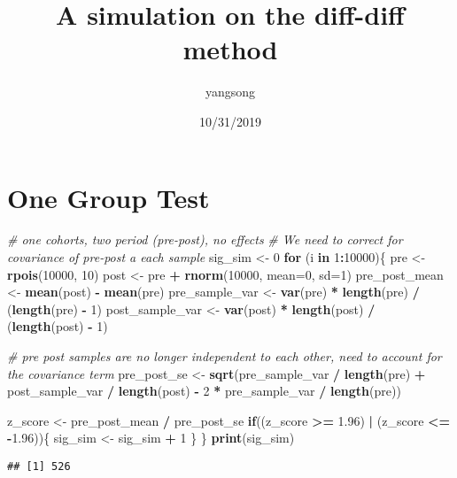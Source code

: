 \documentclass[]{article}
\title{A simulation on the diff-diff method}
\author{yangsong}
\date{10/31/2019}
\newenvironment{Shaded}{\begin{snugshade}}{\end{snugshade}}
\newcommand{\KeywordTok}[1]{\textcolor[rgb]{0.13,0.29,0.53}{\textbf{#1}}}
\newcommand{\DataTypeTok}[1]{\textcolor[rgb]{0.13,0.29,0.53}{#1}}
\newcommand{\DecValTok}[1]{\textcolor[rgb]{0.00,0.00,0.81}{#1}}
\newcommand{\FloatTok}[1]{\textcolor[rgb]{0.00,0.00,0.81}{#1}}
\newcommand{\StringTok}[1]{\textcolor[rgb]{0.31,0.60,0.02}{#1}}
\newcommand{\CommentTok}[1]{\textcolor[rgb]{0.56,0.35,0.01}{\textit{#1}}}
\newcommand{\ControlFlowTok}[1]{\textcolor[rgb]{0.13,0.29,0.53}{\textbf{#1}}}
\newcommand{\OperatorTok}[1]{\textcolor[rgb]{0.81,0.36,0.00}{\textbf{#1}}}
\newcommand{\NormalTok}[1]{#1}
\begin{document}
\maketitle

{
\setcounter{tocdepth}{2}
\tableofcontents
}
\section{One Group Test}\label{one-group-test}

\begin{Shaded}
\begin{Highlighting}[]
\CommentTok{# one cohorts, two period (pre-post), no effects}
\CommentTok{# We need to correct for covariance of pre-post a each sample}
\NormalTok{sig_sim <-}\StringTok{ }\DecValTok{0} 
\ControlFlowTok{for}\NormalTok{ (i }\ControlFlowTok{in} \DecValTok{1}\OperatorTok{:}\DecValTok{10000}\NormalTok{)\{}
\NormalTok{  pre <-}\StringTok{ }\KeywordTok{rpois}\NormalTok{(}\DecValTok{10000}\NormalTok{, }\DecValTok{10}\NormalTok{)}
\NormalTok{  post <-}\StringTok{ }\NormalTok{pre }\OperatorTok{+}\StringTok{ }\KeywordTok{rnorm}\NormalTok{(}\DecValTok{10000}\NormalTok{, }\DataTypeTok{mean=}\DecValTok{0}\NormalTok{, }\DataTypeTok{sd=}\DecValTok{1}\NormalTok{)}
\NormalTok{  pre_post_mean <-}\StringTok{ }\KeywordTok{mean}\NormalTok{(post) }\OperatorTok{-}\StringTok{ }\KeywordTok{mean}\NormalTok{(pre)}
\NormalTok{  pre_sample_var <-}\StringTok{  }\KeywordTok{var}\NormalTok{(pre) }\OperatorTok{*}\StringTok{ }\KeywordTok{length}\NormalTok{(pre) }\OperatorTok{/}\StringTok{ }\NormalTok{(}\KeywordTok{length}\NormalTok{(pre) }\OperatorTok{-}\StringTok{ }\DecValTok{1}\NormalTok{)}
\NormalTok{  post_sample_var <-}\StringTok{  }\KeywordTok{var}\NormalTok{(post) }\OperatorTok{*}\StringTok{ }\KeywordTok{length}\NormalTok{(post) }\OperatorTok{/}\StringTok{ }\NormalTok{(}\KeywordTok{length}\NormalTok{(post) }\OperatorTok{-}\StringTok{ }\DecValTok{1}\NormalTok{)}

  \CommentTok{# pre post samples are no longer independent to each other, need to account for the covariance term}
\NormalTok{  pre_post_se <-}\StringTok{ }\KeywordTok{sqrt}\NormalTok{(pre_sample_var }\OperatorTok{/}\StringTok{ }\KeywordTok{length}\NormalTok{(pre) }\OperatorTok{+}\StringTok{ }\NormalTok{post_sample_var }\OperatorTok{/}\StringTok{ }\KeywordTok{length}\NormalTok{(post) }\OperatorTok{-}\StringTok{ }\DecValTok{2} \OperatorTok{*}\StringTok{ }\NormalTok{pre_sample_var }\OperatorTok{/}\StringTok{ }\KeywordTok{length}\NormalTok{(pre))}
  
\NormalTok{  z_score <-}\StringTok{ }\NormalTok{pre_post_mean }\OperatorTok{/}\StringTok{ }\NormalTok{pre_post_se}
  \ControlFlowTok{if}\NormalTok{((z_score }\OperatorTok{>=}\StringTok{ }\FloatTok{1.96}\NormalTok{) }\OperatorTok{|}\StringTok{ }\NormalTok{(z_score }\OperatorTok{<=}\StringTok{ }\OperatorTok{-}\FloatTok{1.96}\NormalTok{))\{}
\NormalTok{    sig_sim <-}\StringTok{  }\NormalTok{sig_sim }\OperatorTok{+}\StringTok{ }\DecValTok{1}
\NormalTok{  \}}
\NormalTok{\}}
\KeywordTok{print}\NormalTok{(sig_sim)}
\end{Highlighting}
\end{Shaded}

\begin{verbatim}
## [1] 526
\end{verbatim}
\end{document}
